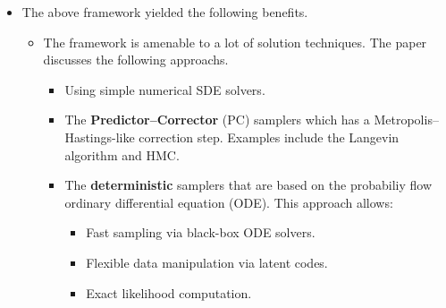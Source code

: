 \documentclass[10pt]{article}
\begin{document}
\begin{itemize}
  \begin{comment}
  \item I think the main goal of the paper is to show the above framework is really powerful, so the authors went to great lengths to show that DDPM and SMLD can be talked about using the framework's language.
  
  \begin{itemize}
    \item The author derived SDEs for both DDPM and SMLD.
    \begin{itemize}
      \item The derivation for the SMLD's SDE was okay.
      \item The derivation of the DDPM's SDE was not at all rigourous. The derived SDE is similar in feeling but does not exactly match what the DDPM does.
    \end{itemize}

    \item They then recasted DDPM's sampling algorithm (which they called ``ancestral sampling'') as simply solving the DDPM's reverse-time SDE with a simple time discritization strategy.
    \begin{itemize}
      \item Because the DDPM's SDE does not quite actually agree mathematically with the DDPM, this was unnatural.
    \end{itemize}

    \item To show the power of the framework further, they also derived ancestral sampling for SMLD.
  \end{itemize}
  \end{comment}

  \item The above framework yielded the following benefits.
  \begin{itemize}
    \item The framework is amenable to a lot of solution techniques. The paper discusses the following approachs.
    \begin{itemize}
      \item Using simple numerical SDE solvers.
      
      \item The {\bf Predictor--Corrector} (PC) samplers which has a Metropolis--Hastings-like correction step. Examples include the Langevin algorithm and HMC.
      
      \item The {\bf deterministic} samplers that are based on the probabiliy flow ordinary differential equation (ODE). This approach allows:
      \begin{itemize}
        \item Fast sampling via black-box ODE solvers.
        \item Flexible data manipulation via latent codes.
        \item Exact likelihood computation.
      \end{itemize}
    \end{itemize}


\end{itemize}
\end{itemize}
\end{document}

